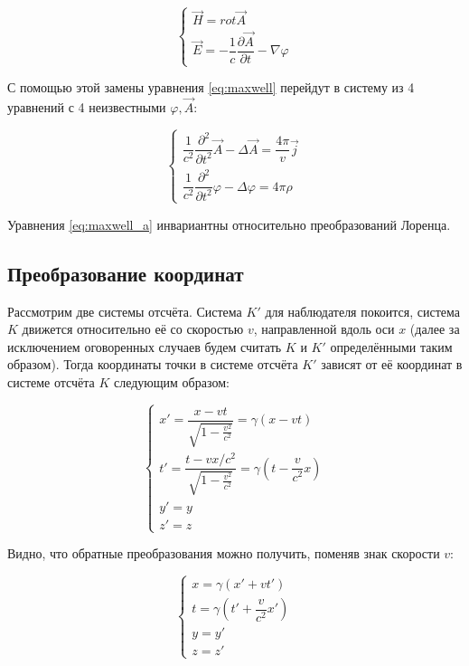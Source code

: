 \documentclass{article}
\begin{document}
\begin{equation}
    \begin{cases}
    \vec{H}=rot\vec{A}\\
    \vec{E}=-\dfrac{1}{c}\dfrac{\partial\vec{A}}{\partial t}-\nabla\varphi
    \end{cases}
\end{equation}

С помощью этой замены уравнения \eqref{eq:maxwell} перейдут в систему из 4 уравнений с 4 неизвестными $\varphi,\vec{A}$:

\begin{equation}\label{eq:maxwell_a}
    \begin{cases}
    \dfrac{1}{c^2}\dfrac{\partial^2}{\partial t^2}\vec{A}-\Delta\vec{A}=\dfrac{4\pi}{v}\vec{j}\\
    \dfrac{1}{c^2}\dfrac{\partial^2}{\partial t^2}\varphi-\Delta\varphi=4\pi\rho
    \end{cases}
\end{equation}

Уравнения \eqref{eq:maxwell_a} инвариантны относительно преобразований Лоренца.

\subsection{Преобразование координат}

Рассмотрим две системы отсчёта. Система $K'$ для наблюдателя покоится, система $K$ движется относительно её со скоростью $v$, направленной вдоль оси $x$ (далее за исключением оговоренных случаев будем считать $K$ и $K'$ определёнными таким образом). Тогда координаты точки в системе отсчёта $K'$ зависят от её координат в системе отсчёта $K$ следующим образом:

\begin{equation}\label{eq:lorentz_coord}
    \begin{cases}
    x'=\dfrac{x-vt}{\sqrt{1-\frac{v^2}{c^2}}}=\gamma\left(x-vt\right)\\
    t'=\dfrac{t-vx/c^2}{\sqrt{1-\frac{v^2}{c^2}}}=\gamma\left(t-\dfrac{v}{c^2}x\right)\\
    y'=y\\
    z'=z
    \end{cases}
\end{equation}

Видно, что обратные преобразования можно получить, поменяв знак скорости $v$:

\begin{equation}
    \begin{cases}
    x=\gamma\left(x'+vt'\right)\\
    t=\gamma\left(t'+\dfrac{v}{c^2}x'\right)\\
    y=y'\\
    z=z'
    \end{cases}
\end{equation}
\end{document}

